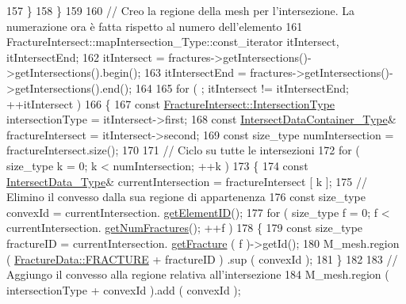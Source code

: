 \begin{DoxyCode}
157             \}
158         \}
159 
160         \textcolor{comment}{// Creo la regione della mesh per l'intersezione. La numerazione ora è fatta rispetto al numero
       dell'elemento}
161         FractureIntersect::mapIntersection\_Type::const\_iterator itIntersect, itIntersectEnd;
162         itIntersect = fractures->getIntersections()->getIntersections().begin();
163         itIntersectEnd = fractures->getIntersections()->getIntersections().end();
164         
165         \textcolor{keywordflow}{for} ( ; itIntersect != itIntersectEnd; ++itIntersect )
166         \{
167                 \textcolor{keyword}{const} \hyperlink{classFractureIntersect_a9a4e4a784fa4c8e359767ed543f89dc5}{FractureIntersect::IntersectionType} 
      intersectionType = itIntersect->first;
168                 \textcolor{keyword}{const} \hyperlink{IntersectData_8h_a822ec3b760dfb603e1cf0bfe3ad5636a}{IntersectDataContainer\_Type}& fractureIntersect = 
      itIntersect->second;
169                 \textcolor{keyword}{const} size\_type numIntersection = fractureIntersect.size();
170 
171                 \textcolor{comment}{// Ciclo su tutte le intersezioni}
172                 \textcolor{keywordflow}{for} ( size\_type k = 0; k < numIntersection; ++k )
173                 \{
174                         \textcolor{keyword}{const} \hyperlink{classIntersectData}{IntersectData\_Type}& currentIntersection = fractureIntersect
       [ k ];
175                         \textcolor{comment}{// Elimino il convesso dalla sua regione di appartenenza}
176                         \textcolor{keyword}{const} size\_type convexId = currentIntersection.
      \hyperlink{classIntersectData_a1872122295e3fec0fb3e81d4098e9949}{getElementID}();
177                         \textcolor{keywordflow}{for} ( size\_type f = 0; f < currentIntersection.
      \hyperlink{classIntersectData_a25def82d58f9508d33ab1a43b2b03ceb}{getNumFractures}(); ++f )
178                         \{
179                                 \textcolor{keyword}{const} size\_type fractureID = currentIntersection.
      \hyperlink{classIntersectData_afef7730d6a494464350ebce088e488ee}{getFracture} ( f )->getId();
180                                 M\_mesh.region ( \hyperlink{classFractureData_aaeea1f30482432d159eda9d98beb5e89a351538e4c78b34b5c0416e21903e1812}{FractureData::FRACTURE} + fractureID )
      .sup ( convexId );
181                         \}
182 
183                         \textcolor{comment}{// Aggiungo il convesso alla regione relativa all'intersezione}
184                         M\_mesh.region ( intersectionType + convexId ).add ( convexId );

\end{DoxyCode}
